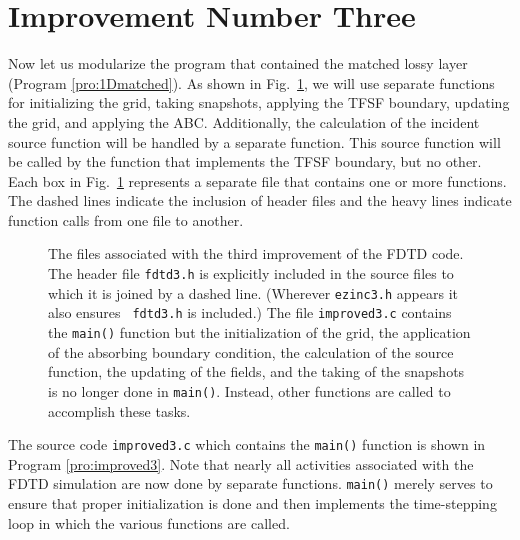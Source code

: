 \section{Improvement Number Three \label{sec:improveThree}}

Now let us modularize the program that contained the matched lossy
layer (Program \ref{pro:1Dmatched}).  As shown in Fig.\
\ref{fig:improvedFiles}, we will use separate functions for
initializing the grid, taking snapshots, applying the TFSF boundary,
updating the grid, and applying the ABC.  Additionally, the
calculation of the incident source function will be handled by a
separate function.  This source function will be called by the
function that implements the TFSF boundary, but no other.  Each box in
Fig.\ \ref{fig:improvedFiles} represents a separate file that contains
one or more functions.  The dashed lines indicate the inclusion of
header files and the heavy lines indicate function calls from one file
to another.

\begin{figure}
  \begin{center}
  \end{center} \caption{The files associated with the third
  improvement of the FDTD code.  The header file {\tt fdtd3.h} is
  explicitly included in the source files to which it is joined by a
  dashed line.  (Wherever {\tt ezinc3.h} appears it also ensures {\tt
  fdtd3.h} is included.)  The file {\tt improved3.c} contains the
  {\tt main()} function but the initialization of the grid, the
  application of the absorbing boundary condition, the calculation of
  the source function, the updating of the fields, and the taking of
  the snapshots is no longer done in {\tt main()}.  Instead, other
  functions are called to accomplish these tasks.}
  \label{fig:improvedFiles}
\end{figure}

The source code {\tt improved3.c} which contains the {\tt main()}
function is shown in Program \ref{pro:improved3}.  Note that nearly
all activities associated with the FDTD simulation are now done by
separate functions.  {\tt main()} merely serves to ensure that proper
initialization is done and then implements the time-stepping loop in
which the various functions are called.

